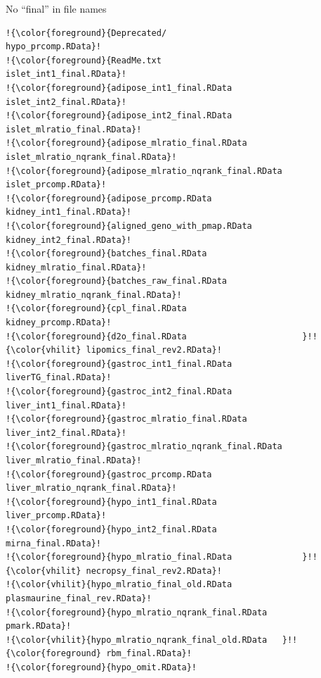 \documentclass[aspectratio=169,12pt,t]{beamer}
\begin{document}
\begin{frame}[fragile,c]{No ``{\hilit final}'' in file names}
\begin{center}
\begin{minipage}[c]{9.5cm}
\begin{semiverbatim}
\lstset{basicstyle=\tiny}
\begin{lstlisting}[escapechar=!,linewidth=9.5cm]
!{\color{foreground}{Deprecated/                            hypo_prcomp.RData}!
!{\color{foreground}{ReadMe.txt                             islet_int1_final.RData}!
!{\color{foreground}{adipose_int1_final.RData               islet_int2_final.RData}!
!{\color{foreground}{adipose_int2_final.RData               islet_mlratio_final.RData}!
!{\color{foreground}{adipose_mlratio_final.RData            islet_mlratio_nqrank_final.RData}!
!{\color{foreground}{adipose_mlratio_nqrank_final.RData     islet_prcomp.RData}!
!{\color{foreground}{adipose_prcomp.RData                   kidney_int1_final.RData}!
!{\color{foreground}{aligned_geno_with_pmap.RData           kidney_int2_final.RData}!
!{\color{foreground}{batches_final.RData                    kidney_mlratio_final.RData}!
!{\color{foreground}{batches_raw_final.RData                kidney_mlratio_nqrank_final.RData}!
!{\color{foreground}{cpl_final.RData                        kidney_prcomp.RData}!
!{\color{foreground}{d2o_final.RData                       }!!{\color{vhilit} lipomics_final_rev2.RData}!
!{\color{foreground}{gastroc_int1_final.RData               liverTG_final.RData}!
!{\color{foreground}{gastroc_int2_final.RData               liver_int1_final.RData}!
!{\color{foreground}{gastroc_mlratio_final.RData            liver_int2_final.RData}!
!{\color{foreground}{gastroc_mlratio_nqrank_final.RData     liver_mlratio_final.RData}!
!{\color{foreground}{gastroc_prcomp.RData                   liver_mlratio_nqrank_final.RData}!
!{\color{foreground}{hypo_int1_final.RData                  liver_prcomp.RData}!
!{\color{foreground}{hypo_int2_final.RData                  mirna_final.RData}!
!{\color{foreground}{hypo_mlratio_final.RData              }!!{\color{vhilit} necropsy_final_rev2.RData}!
!{\color{vhilit}{hypo_mlratio_final_old.RData           plasmaurine_final_rev.RData}!
!{\color{foreground}{hypo_mlratio_nqrank_final.RData        pmark.RData}!
!{\color{vhilit}{hypo_mlratio_nqrank_final_old.RData   }!!{\color{foreground} rbm_final.RData}!
!{\color{foreground}{hypo_omit.RData}!
\end{lstlisting}
\end{semiverbatim}
\end{minipage}
\end{center}


\end{frame}
\end{document}
